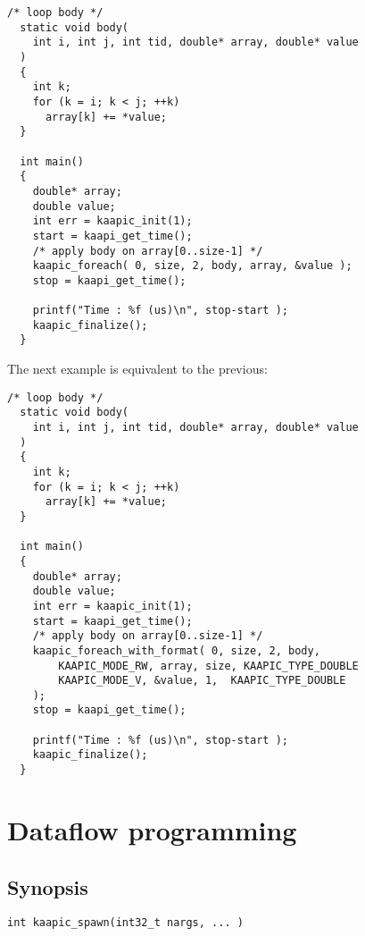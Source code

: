 \documentclass[a4paper, 11pt]{article}
\begin{document}
\begin{small}
\begin{lstlisting}[frame=tb]
  /* loop body */
  static void body(
    int i, int j, int tid, double* array, double* value
  ) 
  {
    int k;
    for (k = i; k < j; ++k)
      array[k] += *value;
  }

  int main()
  {
    double* array;
    double value;
    int err = kaapic_init(1);
    start = kaapi_get_time(); 
    /* apply body on array[0..size-1] */
    kaapic_foreach( 0, size, 2, body, array, &value );
    stop = kaapi_get_time(); 

    printf("Time : %f (us)\n", stop-start );
    kaapic_finalize();
  }
\end{lstlisting}
\end{small}

The next example is equivalent to the previous:
\begin{small}
\begin{lstlisting}[frame=tb]
  /* loop body */
  static void body(
    int i, int j, int tid, double* array, double* value
  ) 
  {
    int k;
    for (k = i; k < j; ++k)
      array[k] += *value;
  }

  int main()
  {
    double* array;
    double value;
    int err = kaapic_init(1);
    start = kaapi_get_time(); 
    /* apply body on array[0..size-1] */
    kaapic_foreach_with_format( 0, size, 2, body, 
        KAAPIC_MODE_RW, array, size, KAAPIC_TYPE_DOUBLE
        KAAPIC_MODE_V, &value, 1,  KAAPIC_TYPE_DOUBLE
    );
    stop = kaapi_get_time(); 

    printf("Time : %f (us)\n", stop-start );
    kaapic_finalize();
  }
\end{lstlisting}
\end{small}



\newpage
\section{Dataflow programming}
\subsection{Synopsis}
\begin{small}
\lstset{language=C}
\begin{lstlisting}[frame=tb]
int kaapic_spawn(int32_t nargs, ... )
\end{lstlisting}
\end{small}
\end{document}
